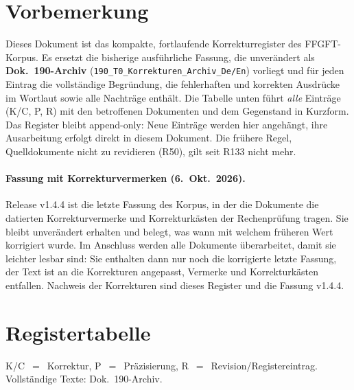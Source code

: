 
\providecommand{\QM}{\textbf{[Q]}}
\section*{Vorbemerkung}

Dieses Dokument ist das kompakte, fortlaufende Korrekturregister des FFGFT-Korpus. Es ersetzt die bisherige ausf\"uhrliche Fassung, die unver\"andert als \textbf{Dok.~190-Archiv} (\texttt{190\_T0\_Korrekturen\_Archiv\_De/En}) vorliegt und f\"ur jeden Eintrag die vollst\"andige Begr\"undung, die fehlerhaften und korrekten Ausdr\"ucke im Wortlaut sowie alle Nachtr\"age enth\"alt. Die Tabelle unten f\"uhrt \emph{alle} Eintr\"age (K/C, P, R) mit den betroffenen Dokumenten und dem Gegenstand in Kurzform. Das Register bleibt append-only: Neue Eintr\"age werden hier angeh\"angt, ihre Ausarbeitung erfolgt direkt in diesem Dokument. Die fr\"uhere Regel, Quelldokumente nicht zu revidieren (R50), gilt seit R133 nicht mehr.

\paragraph{Fassung mit Korrekturvermerken (6.~Okt.~2026).} Release v1.4.4 ist die letzte Fassung des Korpus, in der die Dokumente die datierten Korrekturvermerke und Korrekturk\"asten der Rechenpr\"ufung tragen. Sie bleibt unver\"andert erhalten und belegt, was wann mit welchem fr\"uheren Wert korrigiert wurde. Im Anschluss werden alle Dokumente \"uberarbeitet, damit sie leichter lesbar sind: Sie enthalten dann nur noch die korrigierte letzte Fassung, der Text ist an die Korrekturen angepasst, Vermerke und Korrekturk\"asten entfallen. Nachweis der Korrekturen sind dieses Register und die Fassung v1.4.4.

\section{Registertabelle}

\noindent K/C~$=$~Korrektur, P~$=$~Pr\"azisierung, R~$=$~Revision/Registereintrag. Vollst\"andige Texte: Dok.~190-Archiv.


